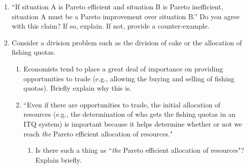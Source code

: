 \begin{enumerate}
\begin{enumerate}
    \end{enumerate}









\item ``If situation A is Pareto efficient and situation B is Pareto inefficient, situation A must be a Pareto improvement over situation B.'' Do you agree with this claim? If so, explain. If not, provide a counter-example.







\item Consider a division problem such as the division of cake or the allocation of fishing quotas.

    \begin{enumerate}

    \item Economists tend to place a great deal of importance on providing opportunities to trade (e.g., allowing the buying and selling of fishing quotas). Briefly explain why this is.


    \item ``Even if there are opportunities to trade, the initial allocation of resources (e.g., the determination of who gets the fishing quotas in an ITQ system) is important because it helps determine whether or not we reach \emph{the} Pareto efficient allocation of resources."

        \begin{enumerate}

        \item Is there such a thing as ``\emph{the} Pareto efficient allocation of resources"? Explain briefly.



\end{enumerate}
\end{enumerate}
\end{enumerate}

